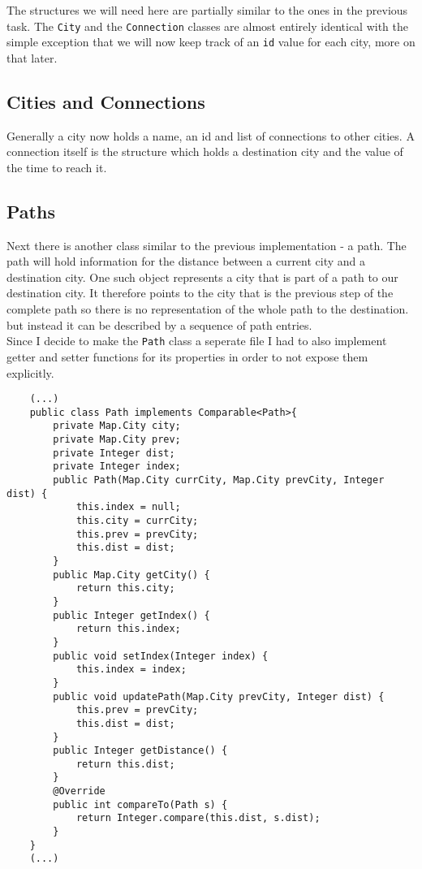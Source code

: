 \documentclass[a4paper,11pt]{article}
\begin{document}
The structures we will need here are partially similar to the ones in the previous task. The {\tt City} and the {\tt Connection} classes are almost entirely identical with the simple exception that we will now keep track of an {\tt id} value for each city, more on that later. 
\subsection*{Cities and Connections}
Generally a city now holds a name, an id and list of connections to other cities. A connection itself is the structure which holds a destination city and the value of the time to reach it.
\subsection*{Paths}
Next there is another class similar to the previous implementation - a path. The path will hold information for the distance between a current city and a destination city. One such object represents a city that is part of a path to our destination city. It therefore points to the city that is the previous step of
the complete path so there is no representation of the whole path to the destination. but instead it can be described by a sequence of path entries.
\\

Since I decide to make the {\tt Path} class a seperate file I had to also implement getter and setter functions for its properties in order to not expose them explicitly.
\begin{verbatim}
    (...)
    public class Path implements Comparable<Path>{
        private Map.City city;
        private Map.City prev;
        private Integer dist;
        private Integer index;
        public Path(Map.City currCity, Map.City prevCity, Integer dist) {
            this.index = null;
            this.city = currCity;
            this.prev = prevCity;
            this.dist = dist;
        }
        public Map.City getCity() {
            return this.city;
        }
        public Integer getIndex() {
            return this.index;
        }
        public void setIndex(Integer index) {
            this.index = index;
        }
        public void updatePath(Map.City prevCity, Integer dist) {
            this.prev = prevCity;
            this.dist = dist;
        }
        public Integer getDistance() {
            return this.dist;
        }
        @Override
        public int compareTo(Path s) {
            return Integer.compare(this.dist, s.dist);
        }
    }
    (...)
\end{verbatim}
\end{document}
